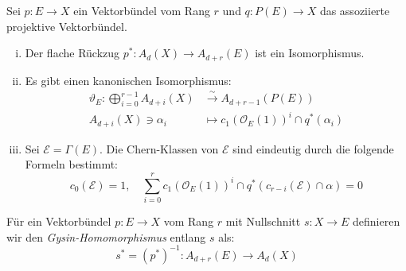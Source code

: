 \documentclass[10pt,a4paper]{article}
\begin{document}
\begin{theorem}
Sei $p:E\to X$ ein Vektorbündel vom Rang $r$ und $q:P(E)\to X$ das assoziierte projektive Vektorbündel.
\begin{enumerate}[(i)]
\item Der flache Rückzug $p^\ast: A_d(X)\to A_{d+r}(E)$ ist ein Isomorphismus.
\item Es gibt einen kanonischen Isomorphismus:
\begin{align*}
\vartheta_E: \bigoplus_{i=0}^{r-1}A_{d+i}(X) &\stackrel{\sim}{\longrightarrow} A_{d+r-1}(P(E))\\
A_{d+i}(X)\ni \alpha_i &\longmapsto c_1(\mathcal{O}_E(1))^i\cap q^\ast(\alpha_i)
\end{align*}
\item Sei $\mathcal{E} = \Gamma(E)$. Die Chern-Klassen von $\mathcal{E}$ sind eindeutig durch die folgende Formeln bestimmt:
\[ c_0(\mathcal{E}) = 1,\quad \sum_{i=0}^r c_1(\mathcal{O}_E(1))^i\cap q^\ast(c_{r-i}(\mathcal{E})\cap\alpha) = 0 \]
\end{enumerate}
\end{theorem}

\begin{definition}
Für ein Vektorbündel $p:E\to X$ vom Rang $r$ mit Nullschnitt $s:X\to E$ definieren wir den \textit{Gysin-Homomorphismus} entlang $s$ als:
\[ s^\ast = (p^\ast)^{-1}: A_{d+r}(E)\to A_d(X) \]
\end{definition}
\end{document}
